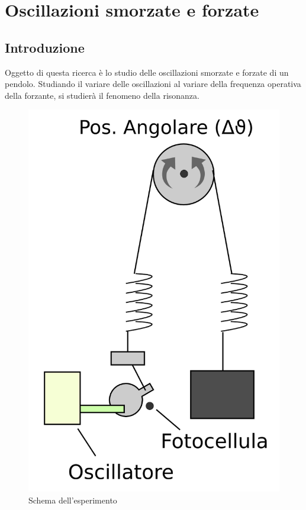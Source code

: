 
\chapter{Oscillazioni smorzate e forzate}
\section{Introduzione}
\mbox 
Oggetto di questa ricerca è lo studio delle oscillazioni smorzate e forzate di un pendolo. Studiando il variare delle oscillazioni al variare della frequenza operativa della forzante, si studierà il fenomeno della risonanza.

\begin{figure}
  \begin{center}
\includegraphics[scale=0.7]{../grafici/oscillazioni-schema.png}
  \end{center}
  \caption*{Schema dell'esperimento}
\end{figure}

